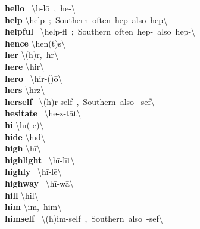 \documentclass[10pt,a4paper]{article}
\begin{document}
\begin{multicols}{2}
\textbf{ hello }\quad \ \textbackslash h\textschwa -\textprimstress l\={o}\ ,\ he-\textbackslash \\
\textbf{ help }\quad \textbackslash \textprimstress help\ ;\ Southern\ often\ \textprimstress hep\ also\ \textprimstress he\textschwa p\textbackslash \\
\textbf{ helpful }\quad \ \textbackslash \textprimstress help-f\textschwa l\ ;\ Southern\ often\ \textprimstress hep-\ also\ \textprimstress he\textschwa p-\textbackslash \\
\textbf{ hence }\quad \textbackslash \textprimstress hen(t)s\textbackslash \\
\textbf{ her }\quad \textbackslash (h)\textschwa r,\ \textprimstress h\textschwa r\textbackslash \\
\textbf{ here }\quad \textbackslash \textprimstress hir\textbackslash \\
\textbf{ hero }\quad \ \textbackslash \textprimstress hir-(\textsecstress )\={o}\textbackslash \\
\textbf{ hers }\quad \textbackslash \textprimstress h\textschwa rz\textbackslash \\
\textbf{ herself }\quad \ \textbackslash (h)\textschwa r-\textprimstress self\ ,\ Southern\ also\ -\textprimstress sef\textbackslash \\
\textbf{ hesitate }\quad \ \textbackslash \textprimstress he-z\textschwa -\textsecstress t\={a}t\textbackslash \\
\textbf{ hi }\quad \textbackslash \textprimstress h\={i}(-\={e})\textbackslash \\
\textbf{ hide }\quad \textbackslash \textprimstress h\={i}d\textbackslash \\
\textbf{ high }\quad \textbackslash \textprimstress h\={i}\textbackslash \\
\textbf{ highlight }\quad \ \textbackslash \textprimstress h\={i}-\textsecstress l\={i}t\textbackslash \\
\textbf{ highly }\quad \ \textbackslash \textprimstress h\={i}-l\={e}\textbackslash \\
\textbf{ highway }\quad \ \textbackslash \textprimstress h\={i}-\textsecstress w\={a}\textbackslash \\
\textbf{ hill }\quad \textbackslash \textprimstress hil\textbackslash \\
\textbf{ him }\quad \textbackslash im,\ \textprimstress him\textbackslash \\
\textbf{ himself }\quad \ \textbackslash (h)im-\textprimstress self\ ,\ Southern\ also\ -\textprimstress sef\textbackslash \\

\end{multicols}
\end{document}
